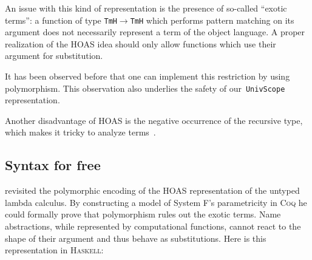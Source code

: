 \documentclass[9pt,authoryear]{sigplanconf}
\begin{document}
%
An issue with this kind of representation is the presence of
    so-called {``}exotic terms{''}{:} a function of type \texttt{TmH}\texttt{\mbox{\hspace{0.50em}}}\texttt{$ \rightarrow $}\texttt{\mbox{\hspace{0.50em}}}\texttt{TmH} which
    performs pattern matching on its argument does not necessarily
    represent a term of the object language. A proper realization of the
    HOAS idea should only allow functions which use their argument for
    substitution.%


%
It has been observed before that one can implement this restriction
    by using polymorphism. This observation also underlies the safety of
    our{~}\texttt{UnivScope} representation.%


%
Another disadvantage of HOAS is the negative occurrence
    of the recursive type, which makes it tricky to analyze
    terms{~}\cite{washburn_boxes_2003}.%


\subsection{Syntax for free}

%
\citet{atkey-hoas-09} revisited the polymorphic encoding of the HOAS
    representation of the untyped lambda calculus. By constructing a
    model of System F{'}s parametricity in \textsc{Coq} he could formally prove
    that polymorphism rules out the exotic terms. Name abstractions,
    while represented by computational functions, cannot react to the
    shape of their argument and thus behave as substitutions. Here is
    this representation in \textsc{Haskell}{:}%


{\nopagebreak }
\end{document}
